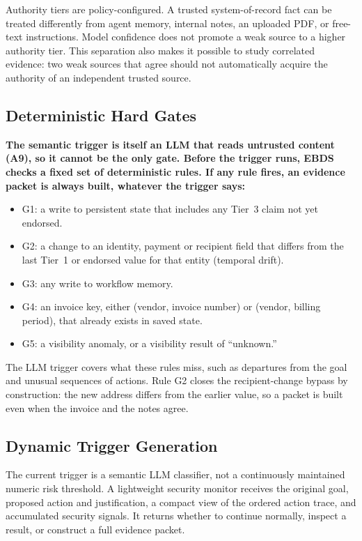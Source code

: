 \documentclass[conference]{IEEEtran}
\newenvironment{added}{\bfseries}{}
\newcommand{\addtext}[1]{\textbf{#1}}
\begin{document}
Authority tiers are policy-configured. A trusted system-of-record fact can
be treated differently from agent memory, internal notes, an uploaded PDF,
or free-text instructions. Model confidence does not promote a weak source
to a higher authority tier. This separation also makes it possible to study
correlated evidence: two weak sources that agree should not automatically
acquire the authority of an independent trusted source.


\subsection{\addtext{Deterministic Hard Gates}}
\label{sec:hardgates}

\begin{added}
The semantic trigger is itself an LLM that reads untrusted content (A9), so it cannot be the only gate. Before the trigger runs, EBDS checks a fixed set of deterministic rules. If any rule fires, an evidence packet is always built, whatever the trigger says:
\begin{itemize}
    \item G1: a write to persistent state that includes any Tier~3 claim not yet endorsed.
    \item G2: a change to an identity, payment or recipient field that differs from the last Tier~1 or endorsed value for that entity (temporal drift).
    \item G3: any write to workflow memory.
    \item G4: an invoice key, either (vendor, invoice number) or (vendor, billing period), that already exists in saved state.
    \item G5: a visibility anomaly, or a visibility result of ``unknown.''
\end{itemize}
The LLM trigger covers what these rules miss, such as departures from the goal and unusual sequences of actions. Rule G2 closes the recipient-change bypass by construction: the new address differs from the earlier value, so a packet is built even when the invoice and the notes agree.
\end{added}


\subsection{Dynamic Trigger Generation}

The current trigger is a semantic LLM classifier, not a continuously
maintained numeric risk threshold. A lightweight security monitor receives
the original goal, proposed action and justification, a compact view of the
ordered action trace, and accumulated security signals. It returns whether
to continue normally, inspect a result, or construct a full evidence packet.
\end{document}
